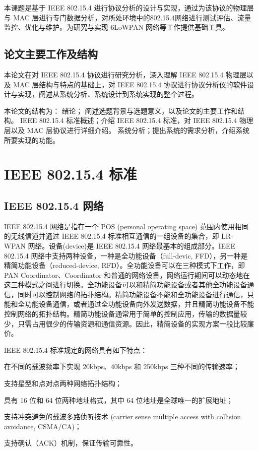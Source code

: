 本课题是基于 IEEE 802.15.4 进行协议分析的设计与实现，通过为该协议的物理层与 MAC 层进行专门数据分析，对所处环境中的802.15.4网络进行测试评估、流量监控、优化与维护。为研究与实现 6LoWPAN 网络等工作提供基础工具。
\section{论文主要工作及结构}
本论文在对 IEEE 802.15.4 协议进行研究分析，深入理解 IEEE 802.15.4 物理层以及 MAC 层结构与特点的基础上，对 IEEE 802.15.4 协议进行协议分析仪的软件设计与实现，阐述从系统分析、系统设计到系统实现的整个过程。

\pagebreak[4]

本论文的结构为：
 {绪论； 阐述选题背景与选题意义，以及论文的主要工作和结构。}
 {IEEE 802.15.4 标准概述；介绍 IEEE 802.15.4 标准，对 IEEE 802.15.4 物理层以及 MAC 层协议进行详细介绍。}
 {系统分析；提出系统的需求分析，介绍系统所要实现的功能。}
\chapter{IEEE 802.15.4 标准}
\section{IEEE 802.15.4 网络}
IEEE 802.15.4 网络是指在一个 POS (personal operating space) 范围内使用相同的无线信道并通过 IEEE 802.15.4 标准相互通信的一组设备的集合，即 LR-WPAN 网络。设备(device)是 IEEE 802.15.4 网络最基本的组成部分。IEEE 802.15.4 网络中支持两种设备，一种是全功能设备（full-devic, FFD），另一种是精简功能设备（reduced-device, RFD）。全功能设备可以在三种模式下工作，即 PAN Coordinator、Coordinator 和普通的网络设备，网络运行期间可以动态地在这三种模式之间进行切换。全功能设备可以和精简功能设备或者其他全功能设备通信，同时可以控制网络的拓扑结构。精简功能设备不能和全功能设备进行通信，只能和全功能设备通信，或者通过全功能设备向外发送数据，并且精简功能设备不能控制网络的拓扑结构。精简功能设备通常用于简单的控制应用，传输的数据量较少，只需占用很少的传输资源和通信资源。因此，精简设备的实现方案一般比较廉价。

IEEE 802.15.4 标准规定的网络具有如下特点：
\begin{compactitem}
\item 在不同的载波频率下实现 20kbps、40kbps 和 250kbps 三种不同的传输速率；
\item 支持星型和点对点两种网络拓扑结构；
\item 具有 16 位和 64 位两种地址格式，其中 64 位地址是全球唯一的扩展地址；
\item 支持冲突避免的载波多路侦听技术 (carrier sense multiple access with collision avoidance, CSMA/CA)；
\item 支持确认（ACK）机制，保证传输可靠性。
\end{compactitem}


